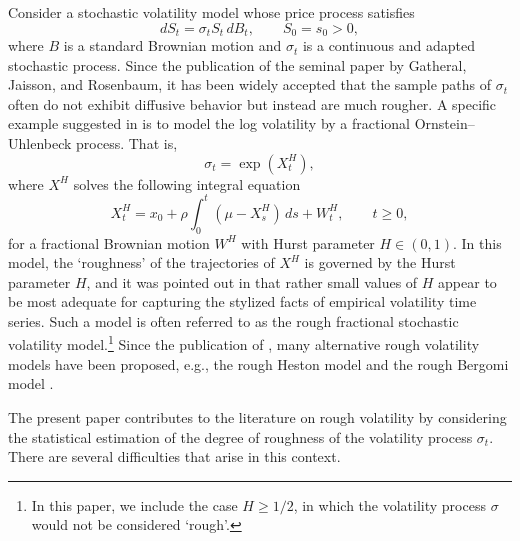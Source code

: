 \documentclass[12pt,reqno]{article}
\numberwithin{equation}{section}
\theoremstyle{definition}
\begin{document}
Consider a stochastic volatility model whose price process satisfies
\begin{equation}\label{price process eq}
dS_t=\sigma_tS_t\,dB_t,\qquad S_0=s_0>0,
\end{equation}
where $B$ is a standard Brownian motion and $\sigma_t$ is a continuous and adapted stochastic process. Since the publication of the seminal paper \cite{GatheralRosenbaum} by Gatheral, Jaisson, and Rosenbaum, it has been widely accepted that the sample paths of $\sigma_t$ often do not exhibit diffusive behavior but instead are much rougher. A specific example suggested in  \cite{GatheralRosenbaum} is to model the log volatility by a fractional Ornstein--Uhlenbeck process. That is, 
\begin{equation}\label{log volatility eq}
\sigma_t=\exp(X^H_t),
\end{equation}
where $X^H$ solves the following integral equation
\begin{equation}\label{OU process eq}
X^H_t=x_0+\rho\int_0^t(\mu-X^H_s)\,ds+W^H_t,\qquad t\ge0,
\end{equation}
for a fractional Brownian motion $W^H$ with Hurst parameter $H\in(0,1)$. In this model, the \lq roughness' of the trajectories of $X^H$ is governed by the Hurst parameter $H$, and it was pointed 
 out 
 in \cite{GatheralRosenbaum} that rather small values of $H$ appear to be most adequate for capturing the stylized facts of empirical volatility time series. Such a model is often referred to as the rough fractional stochastic volatility model.\footnote{In this paper, we include the case $H \ge 1/2$, in which the volatility process $\sigma$ would not be considered \lq rough'.} Since the publication of \cite{GatheralRosenbaum}, many alternative rough volatility models have been proposed, e.g., the rough Heston model \cite{ EuchRosenbaumGatheral2019roughening, EuchRosenbaum2019Characteristic, EuchRosenbaumRoughHeston18} and the rough Bergomi model \cite{BayerGatheralFriz16, Forde2022, Jacquier18RoughBergomi}.
 
 
 
 The present paper contributes to the literature on rough volatility by considering the statistical estimation of the degree of roughness of the volatility process $\sigma_t$. 
 There are several difficulties that arise in this context. 
 
\end{document}
